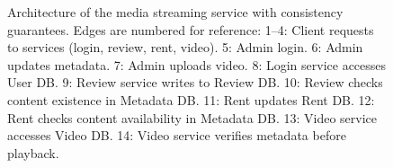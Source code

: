 \begin{figure}[h]
  \caption{Architecture of the media streaming service with
    consistency guarantees.
    Edges are numbered for reference:
    1–4: Client requests to services (login, review, rent, video).
    5: Admin login.
    6: Admin updates metadata.
    7: Admin uploads video.
    8: Login service accesses User DB.
    9: Review service writes to Review DB.
    10: Review checks content existence in Metadata DB.
    11: Rent updates Rent DB.
    12: Rent checks content availability in Metadata DB.
    13: Video service accesses Video DB.
  14: Video service verifies metadata before playback.}
  \label{fig:case-study-media}
\end{figure}

